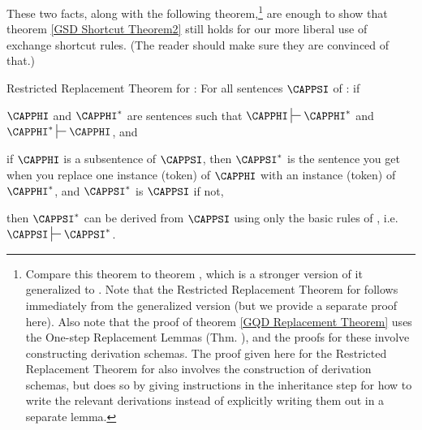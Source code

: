 These two facts, along with the following theorem,\footnote{Compare 
this theorem to theorem , which is a stronger version of it generalized to \GQD{}. 
Note that the Restricted Replacement Theorem for \GSD{} follows immediately from the generalized \GQD{} version (but we provide a separate proof here). 
Also note that the proof of theorem \ref{GQD Replacement Theorem} uses the One-step Replacement Lemmas (Thm. ), and the proofs for these involve constructing derivation schemas. The proof given here for the Restricted Replacement Theorem for \GSD{} also involves the construction of derivation schemas, but does so by giving instructions in the inheritance step for how to write the relevant derivations instead of explicitly writing them out in a separate lemma.} 
are enough to show that theorem \ref{GSD Shortcut Theorem2} still holds for our more liberal use of exchange shortcut rules. (The reader should make sure they are convinced of that.)
\begin{THEOREM}{ Restricted Replacement Theorem for \GSD{}:}
For all sentences $\CAPPSI$ of \GSL{}: if
\begin{cenumerate}
\item $\CAPPHI$ and $\CAPPHI^*$ are \GSL{} sentences such that $\CAPPHI\sststile{}{}\CAPPHI^*$ and $\CAPPHI^*\sststile{}{}\CAPPHI$, and
\item if $\CAPPHI$ is a subsentence of $\CAPPSI$, then $\CAPPSI^*$ is the \GSL{} sentence you get when you replace one instance (token) of $\CAPPHI$ with an instance (token) of $\CAPPHI^*$, and $\CAPPSI^*$ is $\CAPPSI$ if not, 
\end{cenumerate}
then $\CAPPSI^*$ can be derived from $\CAPPSI$ using only the basic rules of \GSD{}, i.e. $\CAPPSI\sststile{}{}\CAPPSI^*$.
\end{THEOREM}
